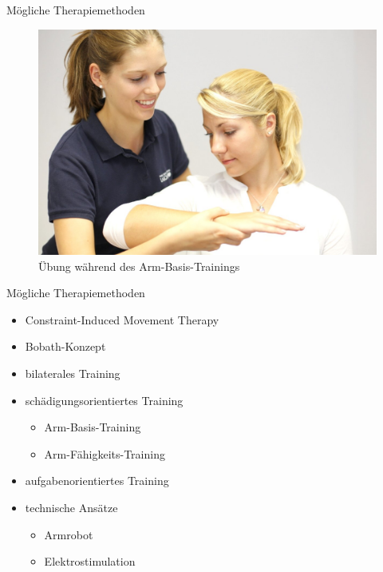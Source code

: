 \documentclass[hyphens]{beamer}
\begin{document}
\begin{frame}{Mögliche Therapiemethoden}
\begin{figure}
	\includegraphics[scale=0.2]{pics/armbasis}
	\caption{Übung während des Arm-Basis-Trainings}
\end{figure}
\end{frame}

\begin{frame}{Mögliche Therapiemethoden}
\begin{itemize}
	\item<1-> Constraint-Induced Movement Therapy
	\item<1-> Bobath-Konzept
	\item<1-> bilaterales Training
	\item<1-> schädigungsorientiertes Training
	\begin{itemize}
		\item<1-> Arm-Basis-Training
		\item<1-> Arm-Fähigkeits-Training
	\end{itemize}
	\item<2-> aufgabenorientiertes Training
	\item<3-> technische Ansätze
	\begin{itemize}
		\item<4-> Armrobot
		\item<5-> Elektrostimulation
	\end{itemize}
\end{itemize}
\end{frame}
\end{document}
